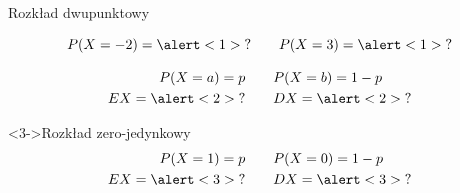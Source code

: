 \documentclass{mp}
\subtitle{Przykładowe rozkłady prawdopodobieństwa}
\begin{document}
\frame{\titlepage}

\begin{frame}{Rozkład dwupunktowy}
{
\begin{center}
\end{center}
\[ P(X=-2)=\alert<1>{?} \qquad P(X=3)=\alert<1>{?} \]
}
{
\begin{block}{}
\begin{align*}
P(X=a)=p & \qquad P(X=b)=1-p \\
EX=\alert<2>{?} & \qquad DX=\alert<2>{?}
\end{align*}
\end{block}
\begin{block}<3->{Rozkład zero-jedynkowy}
\begin{align*}
P(X=1)=p & \qquad P(X=0)=1-p \\
EX=\alert<3>{?} & \qquad DX=\alert<3>{?}
\end{align*}
\end{block}
}
\end{frame}
\end{document}
